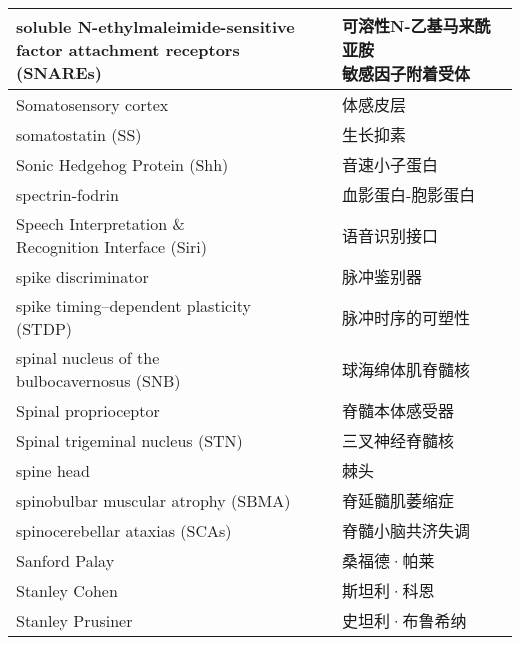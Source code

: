 \begin{longtable}{lll}
	\midrule
	\makecell[l]{soluble N-ethylmaleimide-sensitive \\factor attachment receptors (SNAREs)}   && \makecell[l]{可溶性N-乙基马来酰亚胺\\敏感因子附着受体} \\
	
	\midrule
	Somatosensory cortex   && 体感皮层 \\
	
	\midrule
	somatostatin (SS)  && 生长抑素 \\
	
	\midrule
	Sonic Hedgehog Protein (Shh)  && 音速小子蛋白 \\
	
	\midrule
	spectrin-fodrin   && 血影蛋白-胞影蛋白 \\
	
	\midrule
	\makecell[l]{Speech Interpretation \& \\Recognition Interface (Siri)}  && 语音识别接口 \\
	
	\midrule
	spike discriminator   && 脉冲鉴别器 \\
	
	\midrule
	spike timing–dependent plasticity (STDP)  && 脉冲时序的可塑性 \\
	
	\midrule
	\makecell[l]{spinal nucleus of the\\ bulbocavernosus (SNB)}  && 球海绵体肌脊髓核 \\
	
	\midrule
	Spinal proprioceptor   && 脊髓本体感受器 \\
	
	\midrule
	Spinal trigeminal nucleus (STN)  && 三叉神经脊髓核 \\
	
	\midrule
	spine head   && 棘头 \\
	
	\midrule
	spinobulbar muscular atrophy (SBMA)   && 脊延髓肌萎缩症 \\
	
	\midrule
	spinocerebellar ataxias (SCAs)   && 脊髓小脑共济失调 \\
	
	\midrule
	Sanford Palay   && 桑福德·帕莱 \\
	
	\midrule
	Stanley Cohen   && 斯坦利·科恩 \\
	
	\midrule
	Stanley Prusiner   && 史坦利·布鲁希纳 \\
	

\end{longtable}
